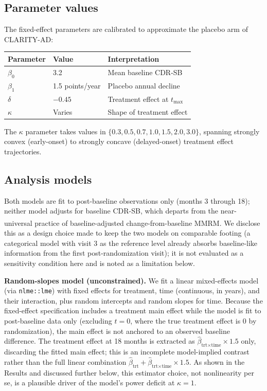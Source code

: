 \documentclass[
  11pt,
]{article}
\newcounter{none} %
\begin{document}
\subsection{Parameter values}\label{parameter-values}

The fixed-effect parameters are calibrated to approximate
the placebo arm of CLARITY-AD:

{\def\LTcaptype{none} %
\begin{longtable}[]{@{}lll@{}}
\toprule\noalign{}
Parameter & Value & Interpretation \\
\midrule\noalign{}
\endhead
\bottomrule\noalign{}
\endlastfoot
\(\beta_0\) & 3.2 & Mean baseline CDR-SB \\
\(\beta_1\) & 1.5 points/year & Placebo annual decline \\
\(\delta\) & \(-0.45\) & Treatment effect at \(t_{\max}\) \\
\(\kappa\) & Varies & Shape of treatment effect \\
\end{longtable}
}

The \(\kappa\) parameter takes values in \(\{0.3, 0.5, 0.7,
1.0, 1.5, 2.0, 3.0\}\), spanning strongly convex
(early-onset) to strongly concave (delayed-onset) treatment
effect trajectories.

\subsection{Analysis models}\label{analysis-models}

Both models are fit to post-baseline observations only
(months 3 through 18); neither model adjusts for baseline
CDR-SB, which departs from the near-universal practice of
baseline-adjusted change-from-baseline MMRM\textsuperscript{}. We disclose this as a
design choice made to keep the two models on comparable
footing (a categorical model with visit 3 as the reference
level already absorbs baseline-like information from the
first post-randomization visit); it is not evaluated as a
sensitivity condition here and is noted as a limitation
below.

\textbf{Random-slopes model (unconstrained).} We fit a linear
mixed-effects model (via \texttt{nlme::lme}) with fixed effects for
treatment, time (continuous, in years), and their
interaction, plus random intercepts and random slopes for
time. Because the fixed-effect specification includes a
treatment main effect while the model is fit to post-baseline
data only (excluding \(t = 0\), where the true treatment effect
is 0 by randomization), the main effect is not anchored to an
observed baseline difference. The treatment effect at 18
months is extracted as \(\hat{\beta}_{\text{trt} \times
\text{time}} \times 1.5\) only, discarding the fitted main
effect; this is an incomplete model-implied contrast rather
than the full linear combination
\(\hat{\beta}_{\text{trt}} + \hat{\beta}_{\text{trt} \times
\text{time}} \times 1.5\). As shown in the Results and
discussed further below, this estimator choice, not
nonlinearity per se, is a plausible driver of the model's
power deficit at \(\kappa = 1\).
\end{document}
